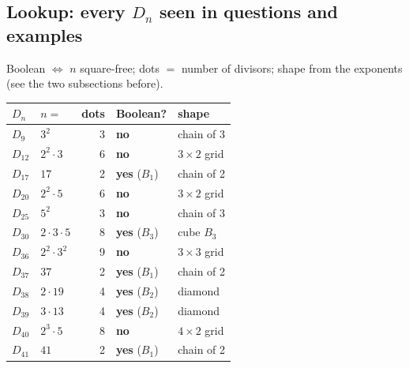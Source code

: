 \documentclass{fkt-notes}
\theoremstyle{definition}
\begin{document}
\subsection{Lookup: every $D_n$ seen in questions and examples}
%
Boolean $\iff$ $n$ square-free; dots $=$ number of divisors; shape from the
exponents (see the two subsections before).
\begin{center}
  \small\renewcommand{\arraystretch}{1.15}
  \begin{tabular}{@{}llrll@{}}
    \toprule
    $D_n$     & $n=$                        & dots & Boolean?             & shape                               \\
    \midrule
    $D_{9}$   & $3^2$                       & 3    & \textbf{no}          & chain of 3                          \\
    $D_{12}$  & $2^2 \cdot 3$               & 6    & \textbf{no}          & $3\times2$ grid                     \\
    $D_{17}$  & $17$                        & 2    & \textbf{yes} ($B_1$) & chain of 2                          \\
    $D_{20}$  & $2^2 \cdot 5$               & 6    & \textbf{no}          & $3\times2$ grid                     \\
    $D_{25}$  & $5^2$                       & 3    & \textbf{no}          & chain of 3                          \\
    $D_{30}$  & $2 \cdot 3 \cdot 5$         & 8    & \textbf{yes} ($B_3$) & cube $B_3$                          \\
    $D_{36}$  & $2^2 \cdot 3^2$             & 9    & \textbf{no}          & $3\times3$ grid                     \\
    $D_{37}$  & $37$                        & 2    & \textbf{yes} ($B_1$) & chain of 2                          \\
    $D_{38}$  & $2 \cdot 19$                & 4    & \textbf{yes} ($B_2$) & diamond                             \\
    $D_{39}$  & $3 \cdot 13$                & 4    & \textbf{yes} ($B_2$) & diamond                             \\
    $D_{40}$  & $2^3 \cdot 5$               & 8    & \textbf{no}          & $4\times2$ grid                     \\
    $D_{41}$  & $41$                        & 2    & \textbf{yes} ($B_1$) & chain of 2                          \\

\end{tabular}
\end{center}
\end{document}
